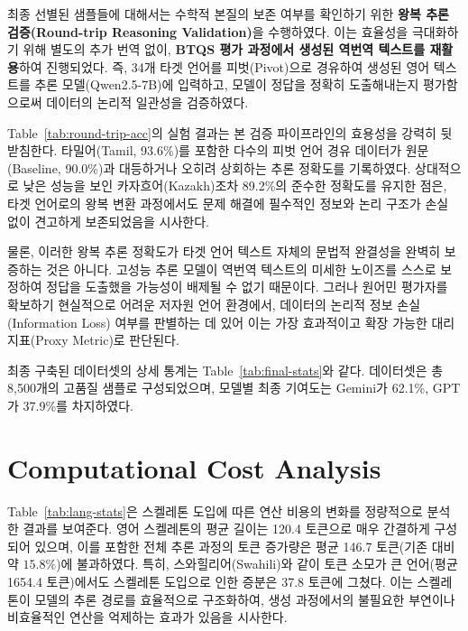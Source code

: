 최종 선별된 샘플들에 대해서는 수학적 본질의 보존 여부를 확인하기 위한 \textbf{왕복 추론 검증(Round-trip Reasoning Validation)}을 수행하였다. 이는 효율성을 극대화하기 위해 별도의 추가 번역 없이, \textbf{BTQS 평가 과정에서 생성된 역번역 텍스트를 재활용}하여 진행되었다. 즉, 34개 타겟 언어를 피벗(Pivot)으로 경유하여 생성된 영어 텍스트를 추론 모델(Qwen2.5-7B)에 입력하고, 모델이 정답을 정확히 도출해내는지 평가함으로써 데이터의 논리적 일관성을 검증하였다.



Table~\ref{tab:round-trip-acc}의 실험 결과는 본 검증 파이프라인의 효용성을 강력히 뒷받침한다. 타밀어(Tamil, 93.6\%)를 포함한 다수의 피벗 언어 경유 데이터가 원문(Baseline, 90.0\%)과 대등하거나 오히려 상회하는 추론 정확도를 기록하였다. 상대적으로 낮은 성능을 보인 카자흐어(Kazakh)조차 89.2\%의 준수한 정확도를 유지한 점은, 타겟 언어로의 왕복 변환 과정에서도 문제 해결에 필수적인 정보와 논리 구조가 손실 없이 견고하게 보존되었음을 시사한다.

물론, 이러한 왕복 추론 정확도가 타겟 언어 텍스트 자체의 문법적 완결성을 완벽히 보증하는 것은 아니다. 고성능 추론 모델이 역번역 텍스트의 미세한 노이즈를 스스로 보정하여 정답을 도출했을 가능성이 배제될 수 없기 때문이다. 그러나 원어민 평가자를 확보하기 현실적으로 어려운 저자원 언어 환경에서, 데이터의 논리적 정보 손실(Information Loss) 여부를 판별하는 데 있어 이는 가장 효과적이고 확장 가능한 대리 지표(Proxy Metric)로 판단된다.

최종 구축된 데이터셋의 상세 통계는 Table~\ref{tab:final-stats}와 같다. 데이터셋은 총 8,500개의 고품질 샘플로 구성되었으며, 모델별 최종 기여도는 Gemini가 62.1\%, GPT가 37.9\%를 차지하였다.




\section{Computational Cost Analysis}

% 
% 

Table~\ref{tab:lang-stats}은 스켈레톤 도입에 따른 연산 비용의 변화를 정량적으로 분석한 결과를 보여준다.
영어 스켈레톤의 평균 길이는 120.4 토큰으로 매우 간결하게 구성되어 있으며, 이를 포함한 전체 추론 과정의 토큰 증가량은 평균 146.7 토큰(기존 대비 약 $15.8\%$)에 불과하였다.
특히, 스와힐리어(Swahili)와 같이 토큰 소모가 큰 언어(평균 1654.4 토큰)에서도 스켈레톤 도입으로 인한 증분은 37.8 토큰에 그쳤다. 이는 스켈레톤이 모델의 추론 경로를 효율적으로 구조화하여, 생성 과정에서의 불필요한 부연이나 비효율적인 연산을 억제하는 효과가 있음을 시사한다.


